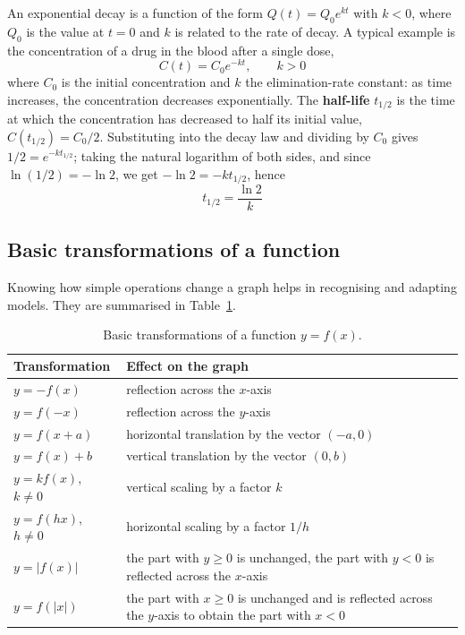 \documentclass[letterpaper,11pt,leqno]{book}
\begin{document}
An exponential decay is a function of the form $Q(t) = Q_0 e^{kt}$ with $k < 0$, where $Q_0$ is the value at $t = 0$ and $k$ is related to the rate of decay. A typical example is the concentration of a drug in the blood after a single dose,
\begin{equation}
\boxed{C(t) = C_0 e^{-kt}, \qquad k > 0}
\label{eq:exp_decay_integrated}
\end{equation}
where $C_0$ is the initial concentration and $k$ the elimination-rate constant: as time increases, the concentration decreases exponentially. The \textbf{half-life} $t_{1/2}$ is the time at which the concentration has decreased to half its initial value, $C(t_{1/2}) = C_0/2$. Substituting into the decay law and dividing by $C_0$ gives $1/2 = e^{-kt_{1/2}}$; taking the natural logarithm of both sides, and since $\ln(1/2) = -\ln 2$, we get $-\ln 2 = -kt_{1/2}$, hence
\begin{equation}
\boxed{t_{1/2} = \frac{\ln 2}{k}}
\label{eq:halflife_final}
\end{equation}

\subsection{Basic transformations of a function}

Knowing how simple operations change a graph helps in recognising and adapting models. They are summarised in Table~\ref{tab:function_transformations}.

\begin{table}[h]
\centering
\caption{Basic transformations of a function $y = f(x)$.}
\label{tab:function_transformations}
\begin{tabular*}{\textwidth}{l@{\extracolsep\fill}p{10cm}}
\toprule
Transformation & Effect on the graph \\
\midrule
$y = -f(x)$ & reflection across the $x$-axis \\
$y = f(-x)$ & reflection across the $y$-axis \\
$y = f(x + a)$ & horizontal translation by the vector $(-a, 0)$ \\
$y = f(x) + b$ & vertical translation by the vector $(0, b)$ \\
$y = kf(x)$, $k \neq 0$ & vertical scaling by a factor $k$ \\
$y = f(hx)$, $h \neq 0$ & horizontal scaling by a factor $1/h$ \\
$y = |f(x)|$ & the part with $y \ge 0$ is unchanged, the part with $y < 0$ is reflected across the $x$-axis \\
$y = f(|x|)$ & the part with $x \ge 0$ is unchanged and is reflected across the $y$-axis to obtain the part with $x < 0$ \\
\bottomrule
\end{tabular*}
\end{table}
\end{document}
